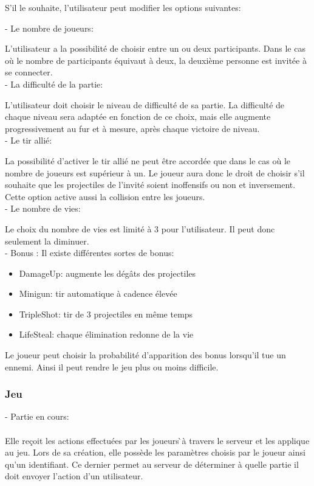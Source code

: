 \documentclass[a4paper,12pt]{article}
\begin{document}
S'il le souhaite, l'utilisateur peut modifier les options suivantes:

- Le nombre de joueurs: 

L'utilisateur a la possibilité de choisir entre un ou deux participants. Dans le cas où le nombre de participants équivaut à deux, la deuxième personne est invitée à se connecter.\\

- La difficulté de la partie:

 L'utilisateur doit choisir le niveau de difficulté  de sa partie. La difficulté de chaque niveau sera adaptée en fonction de ce choix, mais elle augmente progressivement au fur et à mesure, après chaque victoire de niveau. \\

- Le tir allié: 

La possibilité d'activer le tir allié ne peut être accordée que dans le cas où le nombre de joueurs est supérieur à un.
Le joueur aura donc le droit de choisir s'il souhaite que les projectiles de l'invité soient inoffensifs ou non et inversement. Cette option active aussi la collision entre les joueurs. \\

- Le nombre de vies: 

Le choix du nombre de vies est limité à 3 pour l'utilisateur.  Il peut donc seulement la diminuer.\\

- Bonus :
Il existe différentes sortes de bonus:
\begin{itemize}
  \item DamageUp: augmente les dégâts des projectiles
  \item Minigun: tir automatique à cadence élevée
  \item TripleShot: tir de 3 projectiles en même temps
  \item LifeSteal: chaque élimination redonne de la vie
\end{itemize}

Le joueur peut choisir la probabilité d'apparition des bonus lorsqu'il tue un ennemi. 
Ainsi il peut rendre le jeu plus ou moins difficile. 

\subsubsection{Jeu}

- Partie en cours:\\ \\
Elle reçoit les actions effectuées par les joueurs ̀à travers le serveur et les applique au jeu. 
Lors de sa création, elle possède les paramètres choisis par le joueur ainsi qu’un identifiant. 
Ce dernier permet au serveur de déterminer à quelle partie il doit envoyer l’action d’un 
utilisateur.\\
\end{document}
